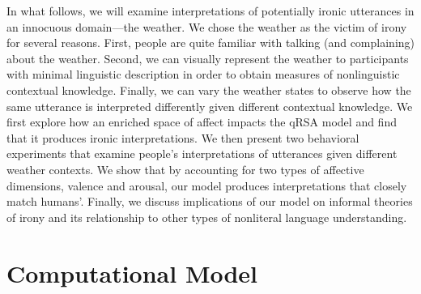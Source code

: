 \documentclass[10pt,letterpaper]{article}
\begin{document}




In what follows, we will examine interpretations of potentially ironic utterances in an innocuous domain---the weather. We chose the weather as the victim of irony for several reasons. First, people are quite familiar with talking (and complaining) about the weather. Second, we can visually represent the weather to participants with minimal linguistic description in order to obtain measures of nonlinguistic contextual knowledge. Finally, we can vary the weather states to observe how the same utterance is interpreted differently given different contextual knowledge. We first explore how an enriched space of affect impacts the qRSA model and find that it produces ironic interpretations. We then present two behavioral experiments that examine people's interpretations of utterances given different weather contexts. We show that by accounting for two types of affective dimensions, valence and arousal, our model produces interpretations that closely match humans'. Finally, we discuss implications of our model on informal theories of irony and its relationship to other types of nonliteral language understanding.

\section{Computational Model}
\end{document}

